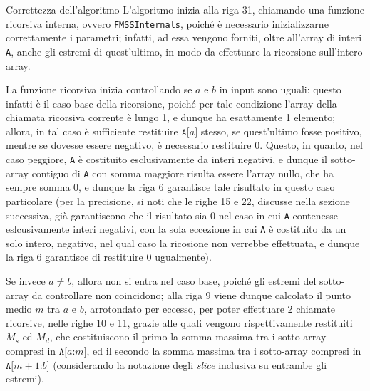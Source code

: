 \documentclass[a4paper, 12pt]{report}
\begin{document}
    \begin{framedobs}{Correttezza dell'algoritmo}
        L'algoritmo inizia alla riga 31, chiamando una funzione ricorsiva interna, ovvero \texttt{FMSSInternals}, poiché è necessario inizializzarne correttamente i parametri; infatti, ad essa vengono forniti, oltre all'array di interi \texttt{A}, anche gli estremi di quest'ultimo, in modo da effettuare la ricorsione sull'intero array.

        La funzione ricorsiva inizia controllando se $a$ e $b$ in input sono uguali: questo infatti è il caso base della ricorsione, poiché per tale condizione l'array della chiamata ricorsiva corrente è lungo 1, e dunque ha esattamente 1 elemento; allora, in tal caso è sufficiente restituire $\texttt{A[}a\texttt{]}$ stesso, se quest'ultimo fosse positivo, mentre se dovesse essere negativo, è necessario restituire 0. Questo, in quanto, nel caso peggiore, \texttt{A} è costituito esclusivamente da interi negativi, e dunque il sotto-array contiguo di \texttt{A} con somma maggiore risulta essere l'array nullo, che ha sempre somma 0, e dunque la riga 6 garantisce tale risultato in questo caso particolare (per la precisione, si noti che le righe 15 e 22, discusse nella sezione successiva, già garantiscono che il risultato sia 0 nel caso in cui \texttt{A} contenesse eslcusivamente interi negativi, con la sola eccezione in cui \texttt{A} è costituito da un solo intero, negativo, nel qual caso la ricosione non verrebbe effettuata, e dunque la riga 6 garantisce di restituire 0 ugualmente).

        Se invece $a \neq b$, allora non si entra nel caso base, poiché gli estremi del sotto-array da controllare non coincidono; alla riga 9 viene dunque calcolato il punto medio $m$ tra $a$ e $b$, arrotondato per eccesso, per poter effettuare 2 chiamate ricorsive, nelle righe 10 e 11, grazie alle quali vengono rispettivamente restituiti $M_s$ ed $M_d$, che costituiscono il primo la somma massima tra i sotto-array compresi in $\texttt{A[}a\texttt{:}m\texttt{]}$, ed il secondo la somma massima tra i sotto-array compresi in $\texttt{A[}m + 1\texttt{:}b\texttt{]}$ (considerando la notazione degli \textit{slice} inclusiva su entrambe gli estremi).


\end{framedobs}
\end{document}
